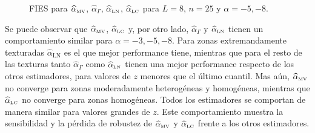 \begin{figure}[htb]
	\caption{\label{InflL8n25:-5y-8}\small FIES para $\widehat{\alpha}_{\text{\tiny{MV}}}$, $\widehat{\alpha}_{\Gamma}$, $\widehat{\alpha}_{\text{\tiny{LN}}}$, $\widehat{\alpha}_{\text{\tiny{LC}}}$ para $L=8$, $n=25$ y $\alpha=-5,-8$.}
\end{figure}

Se puede observar que $\widehat{\alpha}_{\text{\tiny{MV}}}$, $\widehat{\alpha}_{\text{\tiny{LC}}}$ y, por otro lado, $\widehat{\alpha}_{\Gamma}$ y $\widehat{\alpha}_{\text{\tiny{LN}}}$ tienen un comportamiento similar para $\alpha=-3, -5, -8$. Para zonas extremandamente texturadas $\widehat{\alpha}_{\text{LN}}$ es el que mejor performance tiene, mientras que para el resto de las texturas tanto $\widehat{\alpha}_{\Gamma}$ como $\widehat{\alpha}_{\text{\tiny{LN}}}$ tienen una mejor performance respecto de los otros estimadores, para valores de $z$ menores que el último cuantil. Mas aún, $\widehat{\alpha}_{\text{\tiny{MV}}}$ no converge para zonas moderadamente heterogéneas y homogéneas, mientras que $\widehat{\alpha}_{\text{\tiny{LC}}}$ no converge para zonas homogéneas. Todos los estimadores se comportan de manera similar para valores grandes de $z$. Este comportamiento muestra la sensibilidad y la pérdida de robustez de $\widehat{\alpha}_{\text{\tiny{MV}}}$ y $\widehat{\alpha}_{\text{\tiny{LC}}}$ frente a los otros estimadores. 

